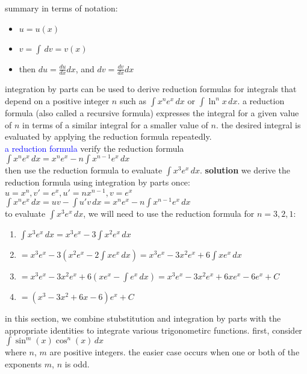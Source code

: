 \documentclass{article}
\begin{document}
summary in terms of notation:
	\begin{itemize}
		\item $u = u(x)$
		\item $v = \int\,dv = v(x)$
		\item then $du = \frac{du}{dx}dx$, and $dv = \frac{dv}{dx}dx$
	\end{itemize}

integration by parts can be used to derive reduction formulas for integrals that depend on a positive integer $n$ such as $\int x^ne^x\,dx$ or $\int \ln^n x\,dx$. a reduction formula (also called a recursive formula) expresses the integral for a given value of $n$ in terms of a similar integral for a smaller value of $n$. the desired integral is evaluated by applying the reduction formula repeatedly.\\

\textcolor{blue}{a reduction formula} verify the reduction formula\\
$\int x^ne^x\,dx = x^ne^x - n \int x^{n-1}e^x\,dx$\\
then use the reduction formula to evaluate $\int x^3e^x\,dx$.
\textbf{solution} we derive the reduction formula using integration by parts once:\\
$u = x^n, v'=e^x, u' = nx^{n-1}, v = e^x$\\
$\int x^ne^x\,dx = uv - \int u'v\,dx = x^ne^x - n\int x^{n-1}e^x\,dx$\\
to evaluate $\int x^3e^x\,dx$, we will need to use the reduction formula for $n = 3, 2, 1$:\\
	\begin{enumerate}
		\item $\int x^3e^x\,dx = x^3e^x - 3\int x^2e^x\,dx$
		\item $= x^3e^x - 3(x^2e^x - 2\int xe^x\,dx) = x^3e^x - 3x^2e^x + 6 \int xe^x\,dx$
		\item $= x^3e^x - 3x^2e^x + 6(xe^x - \int e^x\,dx) = x^3e^x - 3x^2e^x + 6xe^x - 6e^x + C$
		\item $= (x^3 - 3x^2 + 6x - 6)e^x + C$
	\end{enumerate}

in this section, we combine stubstitution and integration by parts with the appropriate identities to integrate various trigonometirc functions. first, consider\\ $\int \sin^m(x)\cos^n(x)\,dx$\\ where $n$, $m$ are positive integers. the easier case occurs when one or both of the exponents $m$, $n$ is odd.\\
\end{document}
